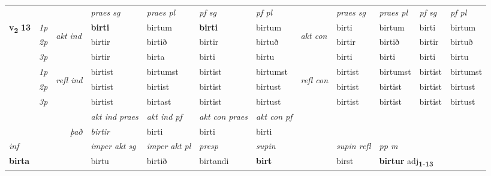 \begin{longtable}[l]{X>{\footnotesize\itshape}llXXXXlXXXX}
 & &   & \textit{praes sg}  & \textit{praes pl}    & \textit{ pf sg} & \textit{pf pl} & & \textit{praes sg}  & \textit{praes pl}    & \textit{pf sg} & \textit{pf pl }  \\ \cmidrule{4-7} \cmidrule{9-12}
 \multirow{2}{*}{{{\textbf{v{\textsubscript{2}}} \Large{\textbf{13}}}}}  & 1p & \multirow{3}{*}{\begin{turn}{90}\textit{akt ind}\end{turn}} & \textbf{birti} & birtum & \textbf{birti} & birtum & \multirow{3}{*}{\begin{turn}{90}\textit{akt con}\end{turn}} &birti & birtum & birti & birtum\\*
 & 2p &  &  birtir  & birtið & birtir & birtuð & & birtir & birtið & birtir & birtuð \\*
 & 3p &  & birtir & birta & birti & birtu & & birti & birti& birti & birtu \\*
\cmidrule{4-7} \cmidrule{9-12}
 & 1p & \multirow{3}{*}{\begin{turn}{90}\textit{refl ind}\end{turn}}  & birtist & birtumst & birtist & birtumst & \multirow{3}{*}{\begin{turn}{90}\textit{refl con}\end{turn}}  &birtist & birtumst & birtist & birtumst \\*
 & 2p &  & birtist & birtist & birtist & birtust & &birtist & birtist & birtist & birtust \\*
 & 3p  & & birtist & birtast & birtist & birtust & & birtist & birtist& birtist & birtust \\*
\cmidrule{4-7} \cmidrule{9-12}

   && &  \textit{akt ind praes} & \textit{akt ind pf} & \textit{akt con praes} & \textit{akt con pf} \\*
\multicolumn{3}{r}{\textit{það}} & birtir & birti & birti & birti \\*

\cmidrule{4-7}
   {\textit{inf}} & &  & \textit{imper akt sg} & \textit{imper akt pl}   & \textit{presp} & \textit{supin} && \textit{supin refl} & \textit{pp m} \\*
  {\textbf{birta}} & && birtu  & birtið   & birtandi &  \textbf{birt} && birst & \multicolumn{2}{l}{\textbf{birtur} adj\textbf{\textsubscript{1-13}}} \\*

\midrule


\end{longtable}
